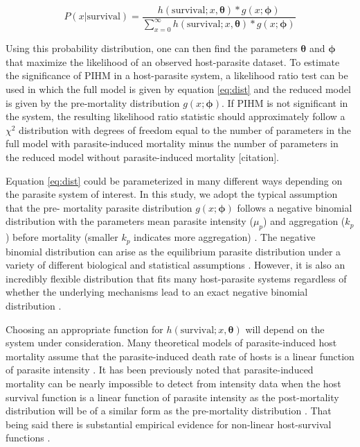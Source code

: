 \documentclass[12pt, a4paper]{article}
\begin{document}
\begin{equation}
    P(x | \text{survival}) = \dfrac{h(\text{survival}; x, \boldsymbol{\theta})  * g(x; \boldsymbol{\phi})}{\sum_{x=0}^{\infty} h(\text{survival}; x, \boldsymbol{\theta})  * g(x; \boldsymbol{\phi})}
    \label{eq:dist}
\end{equation}


Using this probability distribution, one can then find the parameters $\boldsymbol{\theta}$
and $\boldsymbol{\phi}$ that maximize the likelihood of an observed host-parasite dataset.
To estimate the significance of PIHM in a host-parasite system, a likelihood
ratio test can be used in which the full model is given by equation
\ref{eq:dist} and the reduced model is given by the pre-mortality distribution
$g(x; \boldsymbol{\phi})$.  If PIHM is not significant in the system, the resulting
likelihood ratio statistic should approximately follow a $\chi^2$ distribution
with degrees of freedom equal to the number of parameters in the full model with parasite-induced mortality minus the number of parameters in the reduced model without parasite-induced mortality [citation].

Equation \ref{eq:dist} could be parameterized in many different ways depending
on the parasite system of interest. In this study, we adopt the typical assumption that the pre-
mortality parasite distribution $g(x; \boldsymbol{\phi})$ follows a negative binomial
distribution with the parameters mean parasite intensity ($\mu_p$) and
aggregation ($k_p$) before mortality (smaller $k_p$ indicates
more aggregation) \citep{Crofton1971a,AndersonandMay1978,Adjei1986}.   The negative binomial distribution can arise as the equilibrium parasite
distribution under a variety of different biological and statistical assumptions
\citep{Kendall1948a, Boswell1970, Calabrese2011}. However, it is also an incredibly flexible
distribution that fits many host-parasite systems regardless of whether the
underlying mechanisms lead to an exact negative binomial distribution
\citep{Shaw1998}.

Choosing an appropriate function for $h(\text{survival}; x, \boldsymbol{\theta})$ will depend on the system under consideration.  Many theoretical models of
parasite-induced host mortality assume that the parasite-induced death rate of
hosts is a linear function of parasite intensity
\citep{AndersonandMay1978,Dobson1992,Barbour2000}. It has been previously noted that parasite-induced mortality can be nearly impossible to detect from intensity data when the host survival function is a linear function of parasite intensity as the post-mortality distribution will be of a similar form as the pre-mortality distribution \citep{Lanciani1989}.  That being said there is substantial empirical evidence for non-linear host-survival functions  \citep{Benesh2011}.
\end{document}
